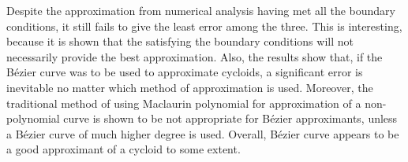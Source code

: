 \documentclass[11pt, oneside, appendixprefix=Appendix]{article}
\theoremstyle{definition}
\numberwithin{figure}{section}
\begin{document}
Despite the approximation from numerical analysis having met all the boundary conditions, it still fails to give the least error among the three. This is interesting, because it is shown that the satisfying the boundary conditions will not necessarily provide the best approximation. Also, the results show that, if the B\'ezier curve was to be used to approximate cycloids, a significant error is inevitable no matter which method of approximation is used. Moreover, the traditional method of using Maclaurin polynomial for approximation of a non-polynomial curve is shown to be not appropriate for B\'ezier approximants, unless a B\'ezier curve of much higher degree is used. Overall, B\'ezier curve appears to be a good approximant of a cycloid to some extent.

\newpage




\newpage
\end{document}
